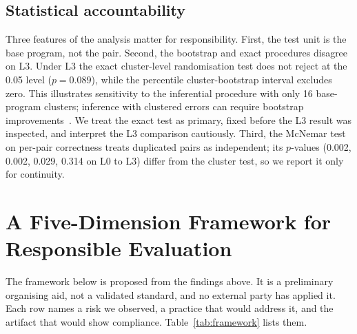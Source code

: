 \documentclass[conference]{IEEEtran}
\begin{document}
\subsection{Statistical accountability}
Three features of the analysis matter for responsibility. First, the test unit is the base program, not the pair. Second, the bootstrap and exact procedures disagree on L3. Under L3 the exact cluster-level randomisation test does not reject at the 0.05 level ($p=0.089$), while the percentile cluster-bootstrap interval excludes zero. This illustrates sensitivity to the inferential procedure with only 16 base-program clusters; inference with clustered errors can require bootstrap improvements~\cite{cameron2008}. We treat the exact test as primary, fixed before the L3 result was inspected, and interpret the L3 comparison cautiously. Third, the McNemar test on per-pair correctness treats duplicated pairs as independent; its $p$-values (0.002, 0.002, 0.029, 0.314 on L0 to L3) differ from the cluster test, so we report it only for continuity.

\section{A Five-Dimension Framework for Responsible Evaluation}
The framework below is proposed from the findings above. It is a preliminary organising aid, not a validated standard, and no external party has applied it. Each row names a risk we observed, a practice that would address it, and the artifact that would show compliance. Table~\ref{tab:framework} lists them.
\end{document}
